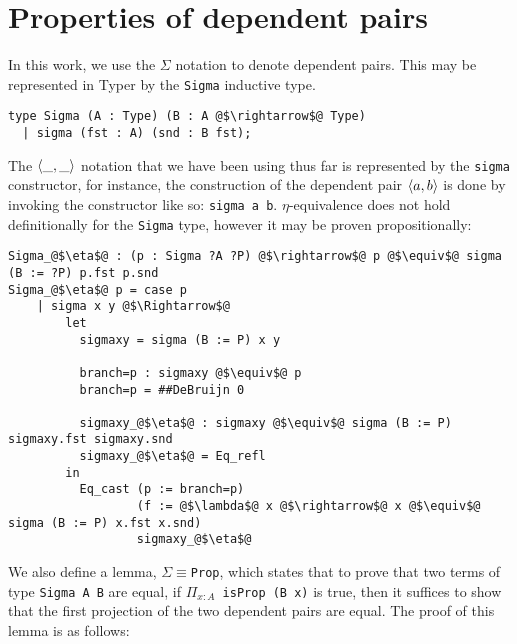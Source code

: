 \documentclass[12pt,twoside,maitrise]{dms}
\theoremstyle{definition}
\numberwithin{equation}{section}
\numberwithin{table}{chapter}
\numberwithin{figure}{chapter}
\newcommand\id[1] {\texttt{#1}}
\newcommand\fn[1] {\texttt{#1}}
\begin{document}
\section{Properties of dependent pairs}\label{app:deppairs-properties}
In this work, we use the $\Sigma$ notation to denote dependent pairs. This may
be represented in Typer by the \id{Sigma} inductive type.


\begin{verbatim}
type Sigma (A : Type) (B : A @$\rightarrow$@ Type)
  | sigma (fst : A) (snd : B fst);
\end{verbatim}

The $\braket{\_, \_}$ notation that we have been using thus far is represented
by the \id{sigma} constructor, for instance, the construction of the dependent
pair $\braket{a, b}$ is done by invoking the constructor like so: \fn{sigma a
  b}. $\eta$-equivalence does not hold definitionally for the \id{Sigma} type,
however it may be proven propositionally:

\begin{verbatim}
Sigma_@$\eta$@ : (p : Sigma ?A ?P) @$\rightarrow$@ p @$\equiv$@ sigma (B := ?P) p.fst p.snd
Sigma_@$\eta$@ p = case p
    | sigma x y @$\Rightarrow$@
        let
          sigmaxy = sigma (B := P) x y

          branch=p : sigmaxy @$\equiv$@ p
          branch=p = ##DeBruijn 0

          sigmaxy_@$\eta$@ : sigmaxy @$\equiv$@ sigma (B := P) sigmaxy.fst sigmaxy.snd
          sigmaxy_@$\eta$@ = Eq_refl
        in
          Eq_cast (p := branch=p)
                  (f := @$\lambda$@ x @$\rightarrow$@ x @$\equiv$@ sigma (B := P) x.fst x.snd)
                  sigmaxy_@$\eta$@
\end{verbatim}

We also define a lemma, \id{$\Sigma${}$\equiv${}Prop}, which states that to
prove that two terms of type \fn{Sigma A B} are equal, if \fn{$\Pi_{x : A}$
  isProp (B x)} is true, then it suffices to show that the first projection of
the two dependent pairs are equal. The proof of this lemma is as follows:
\end{document}
